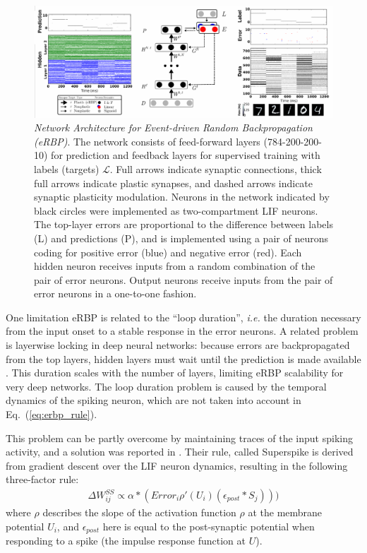 \documentclass[english]{article}
\renewcommand{\refeq}[1]{{Eq.~(\ref{#1})}}
\renewcommand{\cite}{\citep}
\begin{document}
  \begin{figure}
    \begin{center}
      \includegraphics[width=.8\textwidth] {img/eDP_ML_withdata.pdf}
      \hspace{3pt}
    \end{center}
    \caption{
      \label{fig:erbp} 
      \emph{Network Architecture for Event-driven Random Backpropagation (eRBP)}.
    The network consists of feed-forward layers (784-200-200-10) for prediction and feedback layers for supervised training with labels (targets) $\mathcal{L}$.
    Full arrows indicate synaptic connections, thick full arrows indicate plastic synapses, and dashed arrows indicate synaptic plasticity modulation.
    Neurons in the network indicated by black circles were implemented as two-compartment \ac{LIF} neurons.
    The top-layer errors are proportional to the difference between labels (L) and predictions (P), and is implemented using a pair of neurons coding for positive error (blue) and negative error (red).
    Each hidden neuron receives inputs from a random combination of the pair of error neurons.
    Output neurons receive inputs from the pair of error neurons in a one-to-one fashion.}
\end{figure}

One limitation \ac{eRBP} is related to the ``loop duration'', \emph{i.e.} the duration necessary from the input onset to a stable response in the error neurons. 
A related problem is layerwise locking in deep neural networks: because errors are backpropagated from the top layers, hidden layers must wait until the prediction is made available \cite{Jaderberg_etal16_deconeur}. 
This duration scales with the number of layers, limiting \ac{eRBP} scalability for very deep networks.
The loop duration problem is caused by the temporal dynamics of the spiking neuron, which are not taken into account in \refeq{eq:erbp_rule}. 

This problem can be partly overcome by maintaining traces of the input spiking activity, and a solution was reported in \cite{Zenke_Ganguli17_supesupe}. 
Their rule, called Superspike is derived from gradient descent over the \ac{LIF} neuron dynamics, resulting in the following three-factor rule:
\begin{align}\label{eq:ss_rule}
\Delta W_{ij}^{SS} \propto  \alpha \ast (Error_i \rho'(U_i) (\epsilon_{post} \ast S_j)))
\end{align}
where $\rho$ describes the slope of the activation function $\rho$ at the membrane potential $U_i$, and $\epsilon_{post}$ here is equal to the post-synaptic potential when responding to a spike (the impulse response function at $U$).
\end{document}

